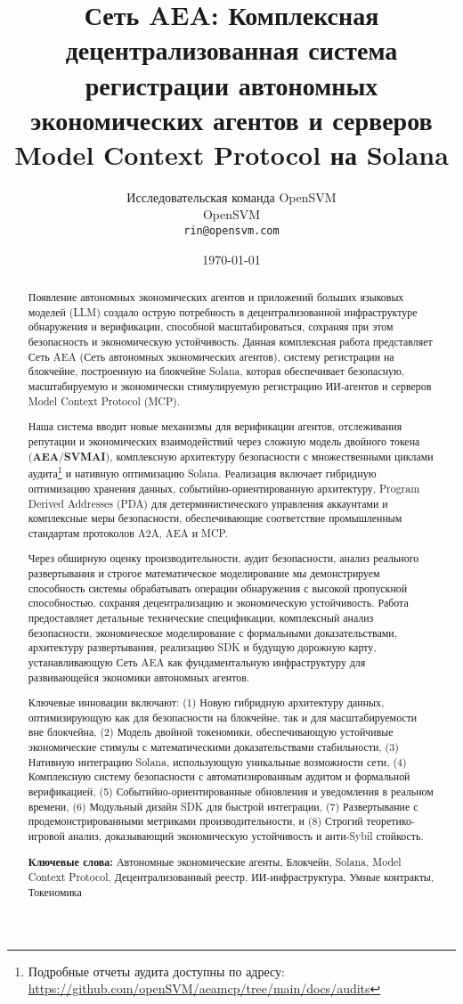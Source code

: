 \documentclass[12pt,a4paper]{article}
\title{Сеть AEA: Комплексная децентрализованная система регистрации автономных экономических агентов и серверов Model Context Protocol на Solana}
\author{Исследовательская команда OpenSVM\\
OpenSVM\\
\texttt{rin@opensvm.com}}
\date{\today}
\begin{document}
\maketitle

\begin{abstract}
Появление автономных экономических агентов и приложений больших языковых моделей (LLM) создало острую потребность в децентрализованной инфраструктуре обнаружения и верификации, способной масштабироваться, сохраняя при этом безопасность и экономическую устойчивость. Данная комплексная работа представляет Сеть AEA (Сеть автономных экономических агентов), систему регистрации на блокчейне, построенную на блокчейне Solana, которая обеспечивает безопасную, масштабируемую и экономически стимулируемую регистрацию ИИ-агентов и серверов Model Context Protocol (MCP).

Наша система вводит новые механизмы для верификации агентов, отслеживания репутации и экономических взаимодействий через сложную модель двойного токена (\textbf{AEA}/\textbf{SVMAI}), комплексную архитектуру безопасности с множественными циклами аудита\footnote{Подробные отчеты аудита доступны по адресу: \url{https://github.com/openSVM/aeamcp/tree/main/docs/audits}} и нативную оптимизацию Solana. Реализация включает гибридную оптимизацию хранения данных, событийно-ориентированную архитектуру, Program Derived Addresses (PDA) для детерминистического управления аккаунтами и комплексные меры безопасности, обеспечивающие соответствие промышленным стандартам протоколов A2A, AEA и MCP.

Через обширную оценку производительности, аудит безопасности, анализ реального развертывания и строгое математическое моделирование мы демонстрируем способность системы обрабатывать операции обнаружения с высокой пропускной способностью, сохраняя децентрализацию и экономическую устойчивость. Работа предоставляет детальные технические спецификации, комплексный анализ безопасности, экономическое моделирование с формальными доказательствами, архитектуру развертывания, реализацию SDK и будущую дорожную карту, устанавливающую Сеть AEA как фундаментальную инфраструктуру для развивающейся экономики автономных агентов.

Ключевые инновации включают: (1) Новую гибридную архитектуру данных, оптимизирующую как для безопасности на блокчейне, так и для масштабируемости вне блокчейна, (2) Модель двойной токеномики, обеспечивающую устойчивые экономические стимулы с математическими доказательствами стабильности, (3) Нативную интеграцию Solana, использующую уникальные возможности сети, (4) Комплексную систему безопасности с автоматизированным аудитом и формальной верификацией, (5) Событийно-ориентированные обновления и уведомления в реальном времени, (6) Модульный дизайн SDK для быстрой интеграции, (7) Развертывание с продемонстрированными метриками производительности, и (8) Строгий теоретико-игровой анализ, доказывающий экономическую устойчивость и анти-Sybil стойкость.

\textbf{Ключевые слова:} Автономные экономические агенты, Блокчейн, Solana, Model Context Protocol, Децентрализованный реестр, ИИ-инфраструктура, Умные контракты, Токеномика
\end{abstract}
\end{document}
